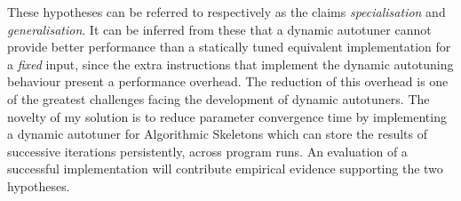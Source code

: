 These hypotheses can be referred to respectively as the claims
\emph{specialisation} and \emph{generalisation}. It can be inferred
from these that a dynamic autotuner cannot provide better performance
than a statically tuned equivalent implementation for a \emph{fixed}
input, since the extra instructions that implement the dynamic
autotuning behaviour present a performance overhead. The reduction of
this overhead is one of the greatest challenges facing the development
of dynamic autotuners. The novelty of my solution is to reduce
parameter convergence time by implementing a dynamic autotuner for
Algorithmic Skeletons which can store the results of successive
iterations persistently, across program runs.
An evaluation of a successful implementation will contribute empirical
evidence supporting the two hypotheses.

